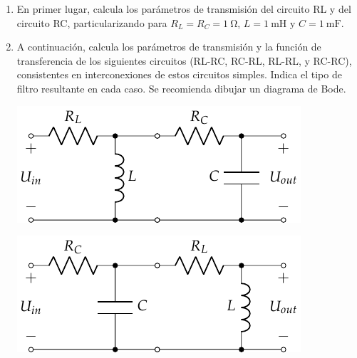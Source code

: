 \documentclass[a4paper,10pt]{article} %
\begin{document}
\begin{enumerate}
\item En primer lugar, calcula los parámetros de transmisión del circuito RL y del circuito RC, particularizando para $R_L = R_C = \qty{1}{\ohm}$, $L = \qty{1}{\milli\henry}$ y $C = \qty{1}{\milli\farad}$.
  
\item A continuación, calcula los parámetros de transmisión y la función de transferencia de los siguientes circuitos (RL-RC, RC-RL, RL-RL, y RC-RC), consistentes en interconexiones de estos circuitos simples. Indica el tipo de filtro resultante en cada caso. Se recomienda dibujar un diagrama de Bode.

  \begin{minipage}{0.5\linewidth}
    \begin{center}
      \includegraphics[height=0.09\textheight]{../figs/circuito_P6_RLRC}
    \end{center}
  \end{minipage}
  \begin{minipage}{0.5\linewidth}
    \begin{center}
      \includegraphics[height=0.09\textheight]{../figs/circuito_P6_RCRL}
    \end{center}
  \end{minipage}


\end{enumerate}
\end{document}
